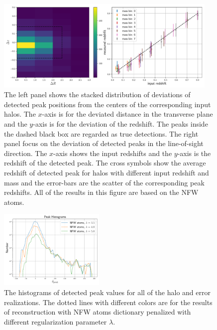 \documentclass[twocolumn]{aastex62}
\begin{document}
\begin{figure}[!ht]
 \centering
 \includegraphics[width=0.95\textwidth]{peak_scatters_f3-1.pdf}
 \caption{The left panel shows the stacked distribution of deviations of detected peak positions 
 from the centers of the corresponding input halos. The $x$-axis is for the deviated distance in the transverse plane and the 
 $y$-axis is for the deviation of the redshift. The peaks inside the dashed black box are regarded as true detections. The 
 right panel focus on the deviation of detected peaks in the line-of-sight direction. The $x$-axis shows the input redshifts 
 and the $y$-axis is the redshift of the detected peak. The cross symbols show the average redshift of detected peak for 
 halos with different input redshift and mass and the error-bars are the scatter of the corresponding peak redshifts. All 
 of the results in this figure are based on the NFW atoms.}
\end{figure}


\begin{figure}[!ht]
 \centering
 \includegraphics[width=0.45\textwidth]{peak_histograms.pdf}
 \caption{The histograms of detected peak values for all of the halo and error realizations. The dotted lines with different 
 colors are for the results of reconstruction with NFW atoms dictionary penalized with different regularization parameter 
 $\lambda$.}
\end{figure}


\clearpage



\appendix
\end{document}

